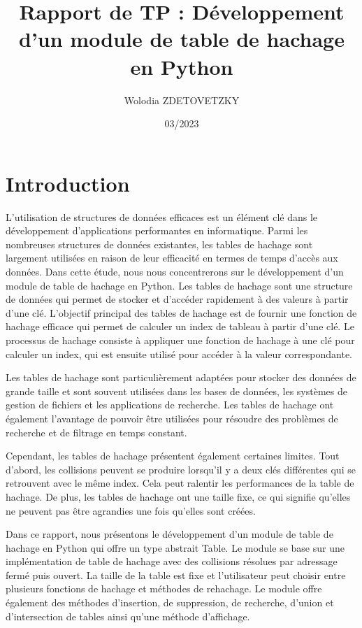 \documentclass{article}
\title{Rapport de TP : Développement d'un module de table de hachage en Python}
\author{Wolodia ZDETOVETZKY}
\date{03/2023}
\begin{document}
    \maketitle
    \tableofcontents
    \newpage

    \section{Introduction}\label{sec:introduction}

    L'utilisation de structures de données efficaces est un élément clé dans le développement d'applications performantes en informatique.
    Parmi les nombreuses structures de données existantes, les tables de hachage sont largement utilisées en raison de leur efficacité en termes de temps d'accès aux données.
    Dans cette étude, nous nous concentrerons sur le développement d'un module de table de hachage en Python.
    Les tables de hachage sont une structure de données qui permet de stocker et d'accéder rapidement à des valeurs à partir d'une clé.
    L'objectif principal des tables de hachage est de fournir une fonction de hachage efficace qui permet de calculer un index de tableau à partir d'une clé.
    Le processus de hachage consiste à appliquer une fonction de hachage à une clé pour calculer un index, qui est ensuite utilisé pour accéder à la valeur correspondante.

    Les tables de hachage sont particulièrement adaptées pour stocker des données de grande taille et sont souvent utilisées dans les bases de données, les systèmes de gestion de fichiers et les applications de recherche.
    Les tables de hachage ont également l'avantage de pouvoir être utilisées pour résoudre des problèmes de recherche et de filtrage en temps constant.

    Cependant, les tables de hachage présentent également certaines limites.
    Tout d'abord, les collisions peuvent se produire lorsqu'il y a deux clés différentes qui se retrouvent avec le même index.
    Cela peut ralentir les performances de la table de hachage.
    De plus, les tables de hachage ont une taille fixe, ce qui signifie qu'elles ne peuvent pas être agrandies une fois qu'elles sont créées.

    Dans ce rapport, nous présentons le développement d'un module de table de hachage en Python qui offre un type abstrait Table.
    Le module se base sur une implémentation de table de hachage avec des collisions résolues par adressage fermé puis ouvert.
    La taille de la table est fixe et l'utilisateur peut choisir entre plusieurs fonctions de hachage et méthodes de rehachage.
    Le module offre également des méthodes d'insertion, de suppression, de recherche, d'union et d'intersection de tables ainsi qu'une méthode d'affichage.
\end{document}
